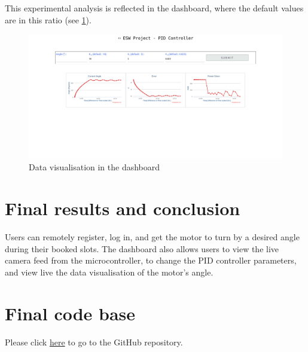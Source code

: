 \documentclass[12pt, a4paper]{article}
\theoremstyle{definition}
\theoremstyle{remark}
\begin{document}
This experimental analysis is reflected in the dashboard, where the default values are in this ratio (see \cref{fig:5}).

\begin{figure}[!h]
    \centering
    \includegraphics[scale=0.2]{img/dashboard.png}
    \caption{Data visualisation in the dashboard}
    \label{fig:5}
\end{figure}

\section{Final results and conclusion }
Users can remotely register, log in, and get the motor to turn by a desired angle during their booked slots. The dashboard also allows users to view the live camera feed from the microcontroller, to change the PID controller parameters, and view live the data visualisation of the motor's angle.

\section{Final code base}
Please click \href{https://github.com/LokeshVenkatachalam/PID-Control-DC-motor}{here} to go to the GitHub repository.
\end{document}
